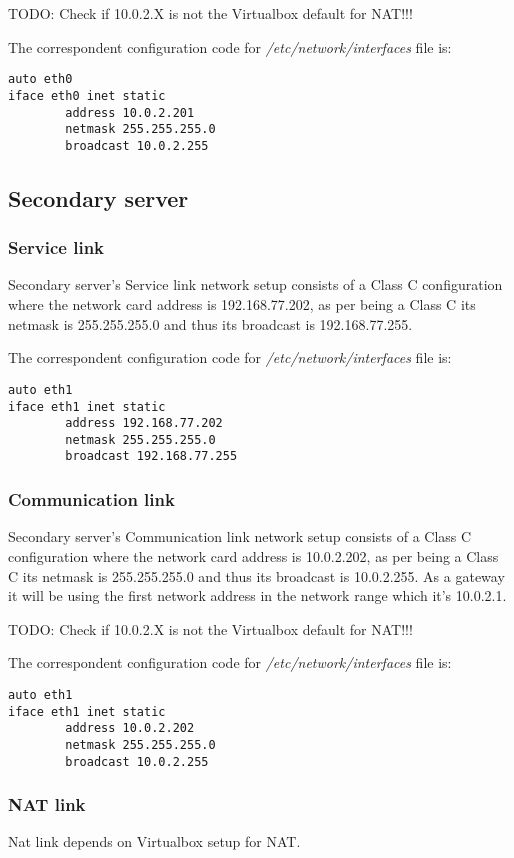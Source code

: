 TODO: Check if 10.0.2.X is not the Virtualbox default for NAT!!!

The correspondent configuration code for \textit{/etc/network/interfaces} file is:
\begin{verbatim}
auto eth0
iface eth0 inet static
        address 10.0.2.201
        netmask 255.255.255.0
        broadcast 10.0.2.255
\end{verbatim}
\subsection {Secondary server}
\subsubsection {Service link}
Secondary server's Service link network setup consists of a Class C configuration where the network card address is 192.168.77.202, as per being a Class C its netmask is 255.255.255.0 and thus its broadcast is 192.168.77.255.

The correspondent configuration code for \textit{/etc/network/interfaces} file is:
\begin{verbatim}
auto eth1
iface eth1 inet static
        address 192.168.77.202
        netmask 255.255.255.0
        broadcast 192.168.77.255
\end{verbatim}

\subsubsection {Communication link}
Secondary server's Communication link network setup consists of a Class C configuration where the network card address is 10.0.2.202, as per being a Class C its netmask is 255.255.255.0 and thus its broadcast is 10.0.2.255. As a gateway it will be using the first network address in the network range which it's 10.0.2.1.

TODO: Check if 10.0.2.X is not the Virtualbox default for NAT!!!

The correspondent configuration code for \textit{/etc/network/interfaces} file is:
\begin{verbatim}
auto eth1
iface eth1 inet static
        address 10.0.2.202
        netmask 255.255.255.0
        broadcast 10.0.2.255
\end{verbatim}

\subsubsection {NAT link}
Nat link depends on Virtualbox setup for NAT.

